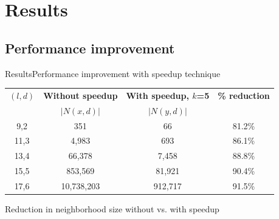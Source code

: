 \documentclass[pdf,xcolor={dvipsnames}]{beamer}
\begin{document}
\section{Results}
	\subsection{Performance improvement}
	\begin{frame}{Results}{Performance improvement with speedup technique}
		\begin{table}[h] %
			\footnotesize
			\renewcommand{\arraystretch}{1.3}
			\label{tbl:neighbors_blockmasking}
			\centering
			\begin{tabular}{|c|c|c|c|}
			\hline 
			\bfseries\boldmath $(l,d)$ & \bfseries\boldmath Without speedup & \bfseries\boldmath With speedup, $k$=5 & \bfseries \% reduction\\
			 & $|N(x,d)|$ & $|N(y,d)|$ & \\
			\hline
			 9,2 &         351  &       66 & 81.2\%\\
			11,3 &       4,983  &      693 & 86.1\%\\
			13,4 &      66,378  &    7,458 & 88.8\%\\
			15,5 &     853,569  &   81,921 & 90.4\%\\
			17,6 &  10,738,203  &  912,717 & 91.5\%\\
			\hline\end{tabular}
			\end{table}

			{\centering \footnotesize Reduction in neighborhood size without vs. with speedup \\}
		\end{frame}
\end{document}
